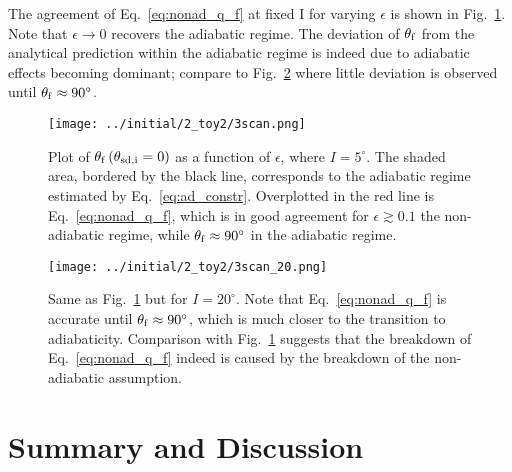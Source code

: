 \documentclass[
        fleqn,
        usenatbib,
        referee,
    ]{mnras}
\newcommand*{\p}[1]{\left(#1\right)}
\begin{document}
The agreement of Eq.~\eqref{eq:nonad_q_f} at fixed I for varying $\epsilon$ is
shown in Fig.~\ref{fig:nonad_3_scan}. Note that $\epsilon \to 0$ recovers the
adiabatic regime. The deviation of $\theta_{\rm f}$ from the analytical
prediction within the adiabatic regime is indeed due to adiabatic effects
becoming dominant; compare to Fig.~\ref{fig:nonad_3_scan_20} where little
deviation is observed until $\theta_{\rm f} \approx 90^\circ$.
\begin{figure}
    \centering
    \texttt{[image: ../initial/2\_toy2/3scan.png]}
    \caption{Plot of $\theta_{\rm  f}\p{\theta_{\rm sd, i} = 0}$ as a function
    of $\epsilon$, where $I = 5^\circ$. The shaded area, bordered by the black
    line, corresponds to the adiabatic regime estimated by
    Eq.~\eqref{eq:ad_constr}. Overplotted in the red line is
    Eq.~\eqref{eq:nonad_q_f}, which is in good agreement for $\epsilon \gtrsim
    0.1$ the non-adiabatic regime, while $\theta_{\rm f} \approx 90^\circ$ in
    the adiabatic regime.}\label{fig:nonad_3_scan}
\end{figure}
\begin{figure}
    \centering
    \texttt{[image: ../initial/2\_toy2/3scan\_20.png]}
    \caption{Same as Fig.~\ref{fig:nonad_3_scan} but for $I=20^\circ$. Note that
    Eq.~\eqref{eq:nonad_q_f} is accurate until $\theta_{\rm f} \approx 90^\circ$,
    which is much closer to the transition to adiabaticity. Comparison with
    Fig.~\ref{fig:nonad_3_scan} suggests that the breakdown of
    Eq.~\eqref{eq:nonad_q_f} indeed is caused by the breakdown of the
    non-adiabatic assumption.}\label{fig:nonad_3_scan_20}
\end{figure}

\section{Summary and Discussion}\label{s:disc}
\end{document}
